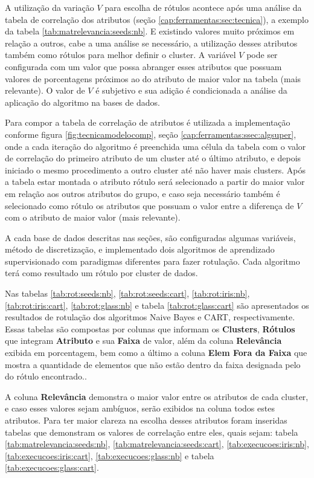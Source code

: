 A utilização da variação ${V}$ para escolha de rótulos acontece após uma análise da tabela de correlação dos atributos (seção \ref{cap:ferramentas:sec:tecnica}), a exemplo da tabela \ref{tab:matrelevancia:seeds:nb}. E existindo valores muito próximos em relação a outros, cabe a uma análise se necessário, a utilização desses atributos também como rótulos para melhor definir o cluster. A variável ${V}$ pode ser configurada com um valor que possa abranger esses atributos que possuam valores de porcentagens próximos ao do atributo de maior valor na tabela (mais relevante). O valor de ${V}$ é subjetivo e sua adição é condicionada a análise da aplicação do algoritmo na bases de dados.

Para compor a tabela de correlação de atributos é utilizada a implementação conforme figura \ref{fig:tecnicamodelocomp}, seção \ref{cap:ferramentas:ssec:algsuper}, onde a cada iteração do algoritmo é preenchida uma célula da tabela com o valor de correlação do primeiro atributo de um cluster até o último atributo, e depois iniciado o mesmo procedimento a outro cluster até não haver mais clusters. Após a tabela estar montada o atributo rótulo será selecionado a partir do maior valor em relação aos outros atributos do grupo, e caso seja necessário também é selecionado como rótulo os atributos que possuam o valor entre a diferença de ${V}$ com o atributo de maior valor (mais relevante). 


A cada base de dados descritas nas seções, são configuradas algumas variáveis, método de discretização, e implementado dois algoritmos de aprendizado supervisionado com paradigmas diferentes para fazer rotulação. Cada algoritmo terá como resultado um rótulo por cluster de dados.


Nas tabelas \ref{tab:rot:seeds:nb}, \ref{tab:rot:seeds:cart}, \ref{tab:rot:iris:nb}, \ref{tab:rot:iris:cart}, \ref{tab:rot:glass:nb} e tabela \ref{tab:rot:glass:cart} são  apresentados os resultados de rotulação dos algoritmos Naive Bayes e CART, respectivamente. Essas tabelas são compostas por colunas que informam os \textbf{Clusters}, \textbf{Rótulos}  que integram \textbf{Atributo} e sua \textbf{Faixa} de valor, além da coluna \textbf{Relevância} exibida em porcentagem, bem como a último a coluna \textbf{Elem Fora da Faixa} que mostra a quantidade de elementos que não estão dentro da faixa designada pelo do rótulo encontrado..

A coluna \textbf{Relevância}  demonstra o maior valor entre os atributos de cada  cluster, e caso esses valores sejam ambíguos, serão exibidos na coluna todos estes  atributos. Para ter maior clareza na escolha desses atributos foram inseridas tabelas que demonstram os valores de correlação entre eles, quais sejam:  tabela \ref{tab:matrelevancia:seeds:nb}, \ref{tab:matrelevancia:seeds:cart}, \ref{tab:execucoes:iris:nb}, \ref{tab:execucoes:iris:cart}, \ref{tab:execucoes:glass:nb} e  tabela \ref{tab:execucoes:glass:cart}. 

